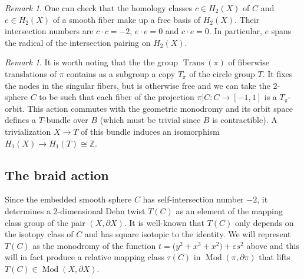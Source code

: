 \documentclass[10pt,letterpaper]{amsart}
\numberwithin{equation}{section}
\def\ZZ{{\mathbb Z}}
\newcommand{\eps}{\varepsilon}
\newcommand{\p}{\partial}
\newcommand\Mod{\operatorname{Mod}}
\newcommand\Trans{\operatorname{Trans}}
\theoremstyle{remark}
\newtheorem{remark}[theorem]{Remark}
\begin{document}
\begin{remark}\label{rem:}
One can check that the  homology classes $c\in H_2(X)$ of $C$ and $e\in H_2(X)$ of a smooth fiber make up a free basis of $H_2(X)$.
Their intersection numbers are $c\cdot c=-2$, $e\cdot e=0$ and $c\cdot e=0$. In particular, $e$ spans the radical of the intersection pairing on $H_2(X)$.
\end{remark}

\begin{remark}\label{rem:}
It is worth noting that the  the group $\Trans(\pi)$ of fiberwise translations  of $\pi$ contains as a subgroup a copy $T_\pi$ of the circle group $T$. It fixes the nodes in the singular fibers, but is otherwise free and we can take the $2$-sphere $C$ to be such that each fiber of the projection $\pi|C: C\to [-1,1]$ is a $T_\pi$-orbit. This action commutes with the geometric monodromy  and its orbit space defines a $T$-bundle over $B$ (which must be trivial since $B$ is contractible). A trivialization  $X\to T$ of this bundle  induces an isomorphism $H_1(X)\to H_1(T)\cong\ZZ$.
\end{remark}



\subsection{The braid action} Since the embedded smooth sphere $C$ has self-intersection number $-2$,  it determines a $2$-dimensional Dehn twist $T(C)$ as an element of  the mapping class group  of the pair $(X, \p X)$. It is well-known that  $T(C)$ only depends on the isotopy class of $C$ and has square isotopic to the identity. We  will  represent  $T(C)$ as the monodromy of the function $t=\big(y^2+x^3+x^2) +\eps  s^2$ above and this will in fact produce a relative mapping class $\tau (C)$ in $\Mod(\pi, \p\pi)$ that lifts  $T(C)\in \Mod(X, \p X)$. 
\end{document}

